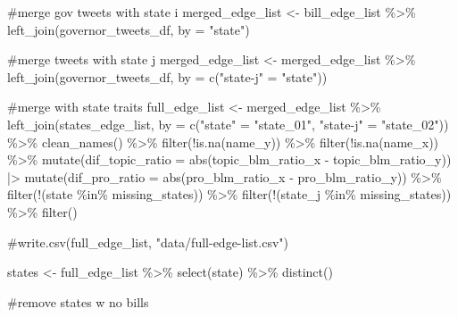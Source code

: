 \documentclass[
  letterpaper,
  DIV=11,
  numbers=noendperiod]{scrartcl}
\newenvironment{Shaded}{\begin{snugshade}}{\end{snugshade}}
\newcommand{\AttributeTok}[1]{\textcolor[rgb]{0.40,0.45,0.13}{#1}}
\newcommand{\CommentTok}[1]{\textcolor[rgb]{0.37,0.37,0.37}{#1}}
\newcommand{\FunctionTok}[1]{\textcolor[rgb]{0.28,0.35,0.67}{#1}}
\newcommand{\NormalTok}[1]{\textcolor[rgb]{0.00,0.23,0.31}{#1}}
\newcommand{\OtherTok}[1]{\textcolor[rgb]{0.00,0.23,0.31}{#1}}
\newcommand{\SpecialCharTok}[1]{\textcolor[rgb]{0.37,0.37,0.37}{#1}}
\newcommand{\StringTok}[1]{\textcolor[rgb]{0.13,0.47,0.30}{#1}}
\begin{document}
\begin{Shaded}
\begin{Highlighting}[]
\CommentTok{\#merge gov tweets with state i }
\NormalTok{merged\_edge\_list }\OtherTok{\textless{}{-}}\NormalTok{ bill\_edge\_list }\SpecialCharTok{\%\textgreater{}\%} 
  \FunctionTok{left\_join}\NormalTok{(governor\_tweets\_df, }\AttributeTok{by =} \StringTok{"state"}\NormalTok{)}

\CommentTok{\#merge tweets with state j}
\NormalTok{merged\_edge\_list }\OtherTok{\textless{}{-}}\NormalTok{ merged\_edge\_list }\SpecialCharTok{\%\textgreater{}\%} 
  \FunctionTok{left\_join}\NormalTok{(governor\_tweets\_df, }\AttributeTok{by =} \FunctionTok{c}\NormalTok{(}\StringTok{"state{-}j"} \OtherTok{=} \StringTok{"state"}\NormalTok{))}
  
\CommentTok{\#merge with state traits}
\NormalTok{full\_edge\_list }\OtherTok{\textless{}{-}}\NormalTok{ merged\_edge\_list }\SpecialCharTok{\%\textgreater{}\%} 
  \FunctionTok{left\_join}\NormalTok{(states\_edge\_list, }\AttributeTok{by =} \FunctionTok{c}\NormalTok{(}\StringTok{"state"} \OtherTok{=} \StringTok{"state\_01"}\NormalTok{, }\StringTok{"state{-}j"} \OtherTok{=} \StringTok{"state\_02"}\NormalTok{)) }\SpecialCharTok{\%\textgreater{}\%} 
  \FunctionTok{clean\_names}\NormalTok{() }\SpecialCharTok{\%\textgreater{}\%} 
  \FunctionTok{filter}\NormalTok{(}\SpecialCharTok{!}\FunctionTok{is.na}\NormalTok{(name\_y)) }\SpecialCharTok{\%\textgreater{}\%} 
  \FunctionTok{filter}\NormalTok{(}\SpecialCharTok{!}\FunctionTok{is.na}\NormalTok{(name\_x)) }\SpecialCharTok{\%\textgreater{}\%} 
  \FunctionTok{mutate}\NormalTok{(}\AttributeTok{dif\_topic\_ratio =} \FunctionTok{abs}\NormalTok{(topic\_blm\_ratio\_x }\SpecialCharTok{{-}}\NormalTok{ topic\_blm\_ratio\_y)) }\SpecialCharTok{|\textgreater{}}
  \FunctionTok{mutate}\NormalTok{(}\AttributeTok{dif\_pro\_ratio =} \FunctionTok{abs}\NormalTok{(pro\_blm\_ratio\_x }\SpecialCharTok{{-}}\NormalTok{ pro\_blm\_ratio\_y)) }\SpecialCharTok{\%\textgreater{}\%} 
  \FunctionTok{filter}\NormalTok{(}\SpecialCharTok{!}\NormalTok{(state }\SpecialCharTok{\%in\%}\NormalTok{ missing\_states)) }\SpecialCharTok{\%\textgreater{}\%} 
  \FunctionTok{filter}\NormalTok{(}\SpecialCharTok{!}\NormalTok{(state\_j }\SpecialCharTok{\%in\%}\NormalTok{ missing\_states)) }\SpecialCharTok{\%\textgreater{}\%} 
  \FunctionTok{filter}\NormalTok{()}

\CommentTok{\#write.csv(full\_edge\_list, "data/full{-}edge{-}list.csv")}

\NormalTok{states }\OtherTok{\textless{}{-}}\NormalTok{ full\_edge\_list }\SpecialCharTok{\%\textgreater{}\%} 
  \FunctionTok{select}\NormalTok{(state) }\SpecialCharTok{\%\textgreater{}\%} 
  \FunctionTok{distinct}\NormalTok{() }

\CommentTok{\#remove states w no bills }
\end{Highlighting}
\end{Shaded}
\end{document}
